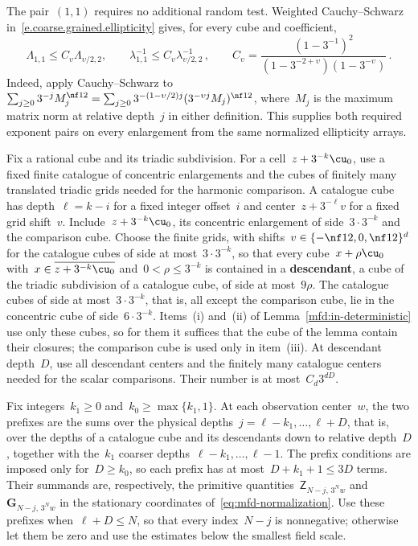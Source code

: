 \documentclass[11pt]{amsart}
\begin{document}
\smallskip

The pair~$(1,1)$ requires no additional random test. Weighted Cauchy--Schwarz in~\eqref{e.coarse.grained.ellipticity} gives, for every cube and coefficient,
\begin{equation*}
	\Lambda_{1,1}\leq C_\upsilon\Lambda_{\upsilon/2,2},\qquad
	\lambda_{1,1}^{-1}\leq C_\upsilon\lambda_{\upsilon/2,2}^{-1}\,,
	\qquad
	C_\upsilon=\frac{(1-3^{-1})^2}
	{(1-3^{-2+\upsilon})(1-3^{-\upsilon})}\,.
\end{equation*}
Indeed, apply Cauchy--Schwarz to~$\sum_{j\geq0}3^{-j}M_j^{\nf12} =\sum_{j\geq0}3^{-(1-\upsilon/2)j}(3^{-\upsilon j}M_j)^{\nf12}$, where~$M_j$ is the maximum matrix norm at relative depth~$j$ in either definition. This supplies both required exponent pairs on every enlargement from the same normalized ellipticity arrays.

\smallskip

Fix a rational cube and its triadic subdivision. For a cell~$z+3^{-k}\cu_0$, use a fixed finite catalogue of concentric enlargements and the cubes of finitely many translated triadic grids needed for the harmonic comparison. A catalogue cube has depth~$\ell=k-i$ for a fixed integer offset~$i$ and center~$z+3^{-\ell}v$ for a fixed grid shift~$v$. Include~$z+3^{-k}\cu_0$, its concentric enlargement of side~$3\cdot3^{-k}$ and the comparison cube. Choose the finite grids, with shifts~$v\in\{-\nf12,0,\nf12\}^d$ for the catalogue cubes of side at most~$3\cdot3^{-k}$, so that every cube~$x+\rho\cu_0$ with~$x\in\overline{z+3^{-k}\cu_0}$ and~$0<\rho\leq3^{-k}$ is contained in a \textbf{descendant}, a cube of the triadic subdivision of a catalogue cube, of side at most~$9\rho$. The catalogue cubes of side at most~$3\cdot3^{-k}$, that is, all except the comparison cube, lie in the concentric cube of side~$6\cdot3^{-k}$. Items~(i) and~(ii) of Lemma~\ref{mfd:in-deterministic} use only these cubes, so for them it suffices that the cube of the lemma contain their closures; the comparison cube is used only in item~(iii). At descendant depth~$D$, use all descendant centers and the finitely many catalogue centers needed for the scalar comparisons. Their number is at most~$C_d3^{dD}$.

\smallskip

Fix integers~$k_1\geq0$ and~$k_0\geq\max\{k_1,1\}$. At each observation center~$w$, the two prefixes are the sums over the physical depths~$j=\ell-k_1,\ldots,\ell+D$, that is, over the depths of a catalogue cube and its descendants down to relative depth~$D$, together with the~$k_1$ coarser depths~$\ell-k_1,\ldots,\ell-1$. The prefix conditions are imposed only for~$D\geq k_0$, so each prefix has at most~$D+k_1+1\leq3D$ terms. Their summands are, respectively, the primitive quantities~$\mathsf Z_{N-j,\,3^Nw}$ and~$\mathbf G_{N-j,\,3^Nw}$ in the stationary coordinates of~\eqref{eq:mfd-normalization}. Use these prefixes when~$\ell+D\leq N$, so that every index~$N-j$ is nonnegative; otherwise let them be zero and use the estimates below the smallest field scale.
\end{document}
